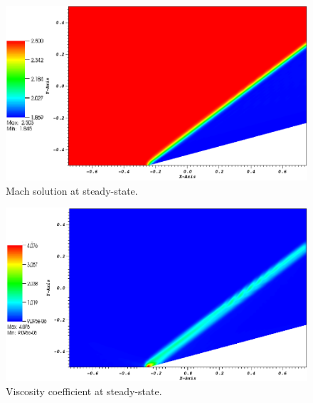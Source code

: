         \begin{figure}[H]%
                \centering
                \includegraphics[scale=.50]{figures/CompressionCorner2D_mach.png}
                \caption{Mach solution at steady-state.}
                \label{fig:2d_corner_mach}
        \end{figure}%
        \begin{figure}[H]%
                \centering
                \includegraphics[scale=.50]{figures/CompressionCorner2D_viscosity.png}
                \caption{Viscosity coefficient at steady-state.}
                \label{fig:2d_corner_visc}
        \end{figure}
        
